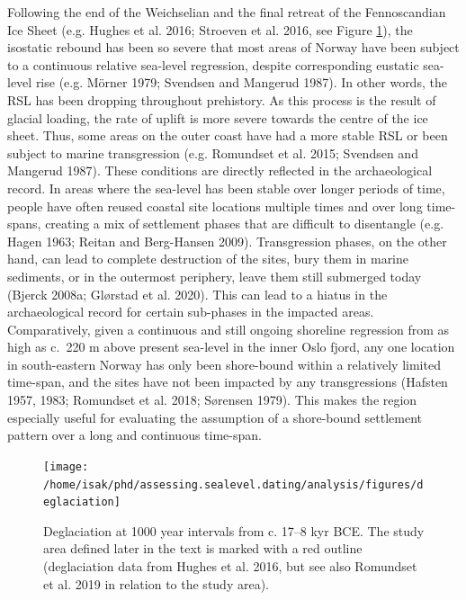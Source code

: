 \documentclass[
]{article}
\begin{document}
Following the end of the Weichselian and the final retreat of the Fennoscandian Ice Sheet (e.g. Hughes et al. 2016; Stroeven et al. 2016, see Figure \ref{fig:deglaciation}), the isostatic rebound has been so severe that most areas of Norway have been subject to a continuous relative sea-level regression, despite corresponding eustatic sea-level rise (e.g. Mörner 1979; Svendsen and Mangerud 1987). In other words, the RSL has been dropping throughout prehistory. As this process is the result of glacial loading, the rate of uplift is more severe towards the centre of the ice sheet. Thus, some areas on the outer coast have had a more stable RSL or been subject to marine transgression (e.g. Romundset et al. 2015; Svendsen and Mangerud 1987). These conditions are directly reflected in the archaeological record. In areas where the sea-level has been stable over longer periods of time, people have often reused coastal site locations multiple times and over long time-spans, creating a mix of settlement phases that are difficult to disentangle (e.g. Hagen 1963; Reitan and Berg-Hansen 2009). Transgression phases, on the other hand, can lead to complete destruction of the sites, bury them in marine sediments, or in the outermost periphery, leave them still submerged today (Bjerck 2008a; Glørstad et al. 2020). This can lead to a hiatus in the archaeological record for certain sub-phases in the impacted areas. Comparatively, given a continuous and still ongoing shoreline regression from as high as c.~220 m above present sea-level in the inner Oslo fjord, any one location in south-eastern Norway has only been shore-bound within a relatively limited time-span, and the sites have not been impacted by any transgressions (Hafsten 1957, 1983; Romundset et al. 2018; Sørensen 1979). This makes the region especially useful for evaluating the assumption of a shore-bound settlement pattern over a long and continuous time-span.

\begin{figure}

{\centering \texttt{[image: /home/isak/phd/assessing.sealevel.dating/analysis/figures/deglaciation]} 

}

\caption{Deglaciation at 1000 year intervals from c. 17--8 kyr BCE. The study area defined later in the text is marked with a red outline (deglaciation data from Hughes et al. 2016, but see also Romundset et al. 2019 in relation to the study area).}\label{fig:deglaciation}
\end{figure}
\end{document}
